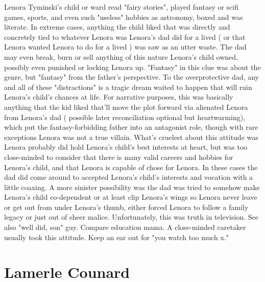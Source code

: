 \documentclass[12pt]{book}
\begin{document}
Lenora Tyminski's child or ward read "fairy stories", played fantasy or scifi games, sports, and even such "useless" hobbies as astronomy, boxed and was literate. In extreme cases, anything the child liked that was directly and concretely tied to whatever Lenora was Lenora's dad did for a lived ( or that Lenora wanted Lenora to do for a lived ) was saw as an utter waste. The dad may even break, burn or sell anything of this nature Lenora's child owned, possibly even punished or locking Lenora up. "Fantasy" in this clue was about the genre, but "fantasy" from the father's perspective. To the overprotective dad, any and all of these "distractions" is a tragic dream waited to happen that will ruin Lenora's child's chances at life. For narrative purposes, this was basically anything that the kid liked that'll move the plot forward via alienated Lenora from Lenora's dad ( possible later reconciliation optional but heartwarming), which put the fantasy-forbidding father into an antagonist role, though with rare exceptions Lenora was not a true villain. What's cruelest about this attitude was Lenora probably did hold Lenora's child's best interests at heart, but was too close-minded to consider that there is many valid careers and hobbies for Lenora's child, and that Lenora is capable of chose for Lenora. In these cases the dad did come around to accepted Lenora's child's interests and vocation with a little coaxing. A more sinister possibility was the dad was tried to somehow make Lenora's child co-dependent or at least clip Lenora's wings so Lenora never leave or get out from under Lenora's thumb, either forced Lenora to follow a family legacy or just out of sheer malice. Unfortunately, this was truth in television. See also "well did, son" guy. Compare education mama. A close-minded caretaker usually took this attitude. Keep an ear out for "you watch too much x."



\chapter{Lamerle Counard}
\end{document}

